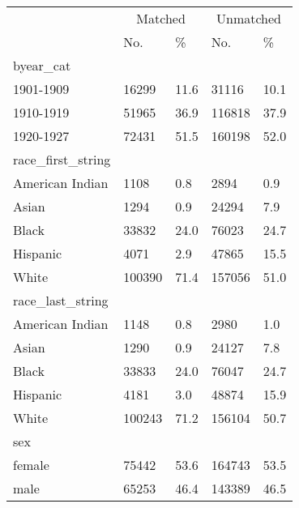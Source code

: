 \captionsetup[table]{labelformat=empty,skip=1pt}
\begin{longtable}{lllll}
\toprule
& \multicolumn{2}{c}{Matched} & \multicolumn{2}{c}{Unmatched} \\ 
 \cmidrule(lr){2-3}\cmidrule(lr){4-5}
 & No. & \% & No. & \% \\ 
\midrule
\multicolumn{1}{l}{byear\_cat} \\ 
\midrule
1901-1909 & 16299 & 11.6 & 31116 & 10.1 \\ 
1910-1919 & 51965 & 36.9 & 116818 & 37.9 \\ 
1920-1927 & 72431 & 51.5 & 160198 & 52.0 \\ 
\midrule
\multicolumn{1}{l}{race\_first\_string} \\ 
\midrule
American Indian & 1108 & 0.8 & 2894 & 0.9 \\ 
Asian & 1294 & 0.9 & 24294 & 7.9 \\ 
Black & 33832 & 24.0 & 76023 & 24.7 \\ 
Hispanic & 4071 & 2.9 & 47865 & 15.5 \\ 
White & 100390 & 71.4 & 157056 & 51.0 \\ 
\midrule
\multicolumn{1}{l}{race\_last\_string} \\ 
\midrule
American Indian & 1148 & 0.8 & 2980 & 1.0 \\ 
Asian & 1290 & 0.9 & 24127 & 7.8 \\ 
Black & 33833 & 24.0 & 76047 & 24.7 \\ 
Hispanic & 4181 & 3.0 & 48874 & 15.9 \\ 
White & 100243 & 71.2 & 156104 & 50.7 \\ 
\midrule
\multicolumn{1}{l}{sex} \\ 
\midrule
female & 75442 & 53.6 & 164743 & 53.5 \\ 
male & 65253 & 46.4 & 143389 & 46.5 \\ 
\bottomrule
\end{longtable}

